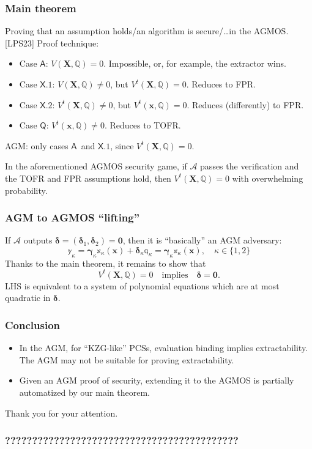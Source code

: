 \documentclass[9pt]{beamer}
\newcommand{\A}{\mathcal A}  %
\newcommand{\caseA}{\ensuremath{\mathsf{A}}}
\newcommand{\caseQ}{\ensuremath{\mathsf{Q}}}
\newcommand{\caseXone}{\ensuremath{\mathsf{X.1}}}
\newcommand{\caseXtwo}{\ensuremath{\mathsf{X.2}}}
\begin{document}
\begin{frame}
\frametitle{Main theorem}
Proving that an assumption holds/an algorithm is secure/\dots in the AGMOS. [LPS23] Proof technique:
\begin{itemize}
    \item Case \caseA: $ V(\bm X, \mathbb Q) = 0 $. Impossible, or, for example, the extractor wins.
    \item Case \caseXone: $ V(\bm X, \mathbb Q) \neq 0 $, but $ V^t(\bm X, \mathbb Q) = 0 $. Reduces to FPR.
    \item Case \caseXtwo: $ V^t(\bm X, \mathbb Q) \neq 0 $, but $ V^t(\bm x, \mathbb Q) = 0 $. Reduces (differently) to FPR.
    \item Case \caseQ: $ V^t(\bm x, \mathbb Q) \neq 0 $. Reduces to TOFR.
\end{itemize}
AGM: only cases \caseA \ and \caseXone, since $ V^t(\bm X, \mathbb Q) = 0 $.
\begin{theorem}[informal]
    In the aforementioned AGMOS security game, if $ \A $ passes the verification and the TOFR and FPR assumptions hold, then $ V^t(\bm X, \mathbb Q) = 0 $ with overwhelming probability.
\end{theorem}
\end{frame}


\begin{frame}
\frametitle{AGM to AGMOS ``lifting''}
If $ \A $ outputs $ \bm \delta = (\bm \delta_1, \bm \delta_2) = \bm 0 $, then it is ``basically'' an AGM adversary:
\[
\mathbb y_\kappa = 
\bm{\gamma}_\kappa \mathbb x_\kappa(\bm x) + \bm \delta_\kappa \mathbb q_\kappa = 
\bm{\gamma}_\kappa \mathbb x_\kappa(\bm x), \quad 
\kappa \in \{ 1, 2 \}
\]
Thanks to the main theorem, it remains to show that
\[
V^t(\bm X, \mathbb Q) = 0 \quad \text{implies} \quad
\bm \delta = \bm 0.
\]
LHS is equivalent to a system of polynomial equations which are at most quadratic in $ \bm \delta $. 
\end{frame}


\begin{frame}
\frametitle{Conclusion}
\begin{itemize}
    \item In the AGM, for ``KZG-like'' PCSs, evaluation binding implies extractability. The AGM may not be suitable for proving extractability.
    \item Given an AGM proof of security, extending it to the AGMOS is partially automatized by our main theorem.
\end{itemize}
Thank you for your attention.
\end{frame}


\begin{frame}
\frametitle{???????????????????????????????????????????}
\end{frame}
\end{document}
